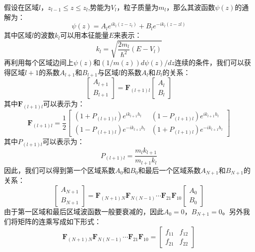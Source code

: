 假设在区域$l$，$z_{l-1} \leqslant z \leqslant z_{l}$,势能为$V_l$，粒子质量为$m_l$，那么其波函数$\psi(z)$的通解为：
\begin{equation}
\label{Equ:generalsolutionsch}
\psi(z) = A_le^{ik_l(z-z_l)}+B_le^{-ik_l(z-zl)}
\end{equation}
其中区域$l$的波数$k_l$可以用本征能量$E$来表示：
\begin{equation}
\label{Equ:kl}
k_l = \sqrt{\frac{2m_l}{\hbar^2}(E-V_l)}
\end{equation}
再利用每个区域边间上$\psi(z)$和$(1/m(z))d\psi(z)/dz$连续的条件，我们可以获得区域$l+1$的系数$A_{l+1}$和$B_{l+1}$与区域$l$的系数$A_l$和$B_l$的关系：
\begin{equation}
\label{Equ:ABrelation}
\begin{bmatrix}
A_{l+1}\\
B_{l+1}
\end{bmatrix} = \textbf{F}_{(l+1)l}\begin{bmatrix}
A_{l}\\
B_{l}
\end{bmatrix}
\end{equation}
其中$\textbf{F}_{(l+1)l}$可以表示为：
\begin{equation}
\label{Equ:Fdetail}
\textbf{F}_{(l+1)l} = \frac{1}{2}\begin{bmatrix}
(1+P_{(l+1)l})e^{ik_{l+1}h_l}&(1-P_{(l+1)l})e^{ik_{l+1}h_l}\\
(1-P_{(l+1)l})e^{-ik_{l+1}h_l}&(1+P_{(l+1)l})e^{-ik_{l+1}h_l}
\end{bmatrix}
\end{equation}
其中$P_{(l+1)l}$可以表示为：
\begin{equation}
\label{Equ:Pdetail}
P_{(l+1)l} = \frac{m_lk_{l+1}}{m_{l+1}k_{l}}
\end{equation}
因此，我们可以得到第一个区域系数$A_{0}$和$B_{0}$和最后一个区域系数$A_{N+1}$和$B_{N+1}$的关系：
\begin{equation}
\label{Equ:Fmulti}
\begin{bmatrix}
A_{N+1}\\
B_{N+1}
\end{bmatrix} = \textbf{F}_{(N+1)N}\textbf{F}_{N(N-1)}\cdots\textbf{F}_{21}\textbf{F}_{10}\begin{bmatrix}
A_{0}\\
B_{0}
\end{bmatrix}
\end{equation}
由于第一区域和最后区域波函数一般要衰减的，因此$A_0 = 0$，$B_{N+1} = 0$。另外我们将矩阵的连乘写成如下形式：
\begin{equation}
\label{Equ:Fsimple}
\textbf{F}_{(N+1)N}\textbf{F}_{N(N-1)}\cdots\textbf{F}_{21}\textbf{F}_{10} = \begin{bmatrix}
f_{11}&f_{12}\\
f_{21}&f_{22}
\end{bmatrix}
\end{equation}
